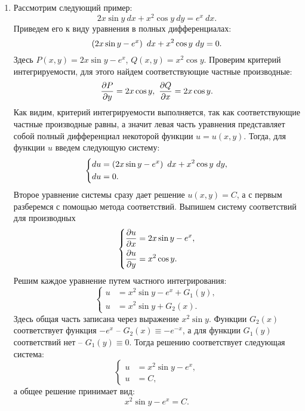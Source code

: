 		\begin{enumerate}

			\item Рассмотрим следующий пример:
				\[ 2x \sin{y} ~ dx + x^2 \cos{y} ~ dy = e^{x} ~ dx. \]
				Приведем его к виду уравнения в полных дифференциалах:
				\[ \left( 2x \sin{y} - e^{x} \right) ~ dx + x^2 \cos{y} ~ dy = 0. \]
				Здесь $P(x, y) = 2x \sin{y} - e^{x}$, $Q(x, y) = x^2 \cos{y}$. Проверим критерий интегрируемости, для этого найдем соответствующие частные производные:
				\[ \dfrac{\partial P}{\partial y} = 2x \cos{y}, ~ \dfrac{\partial Q}{\partial x} = 2x \cos{y}. \]
				Как видим, критерий интегрируемости выполняется, так как соответствующие частные производные равны, а значит левая часть уравнения представляет собой полный дифференциал некоторой функции $u = u(x, y)$. Тогда, для функции $u$ введем следующую систему:
				\[ \left\lbrace \begin{split}
					du &= \left( 2x \sin{y} - e^{x} \right) ~ dx + x^2 \cos{y} ~ dy, \\
					du &= 0.
				\end{split} \right. \]
				Второе уравнение системы сразу дает решение $u(x, y) = C$, а с первым разберемся с помощью метода соответствий. Выпишем систему соответствий для производных
				\[ \left\lbrace \begin{split} 
					\dfrac{\partial u}{\partial x} &= 2x \sin{y} - e^{x}, \\ 
					\dfrac{\partial u}{\partial y} &= x^2 \cos{y}.
				\end{split} \right. \]
				Решим каждое уравнение путем частного интегрирования:
				\[ \left\lbrace \begin{split} 
					u &= x^2 \sin{y} - e^{x} + G_1(y), \\ 
					u &= x^2 \sin{y} + G_2(x).
				\end{split} \right. \]
				Здесь общая часть записана через выражение $x^2 \sin{y}$. Функции $G_2(x)$ соответствует функция $-e^{x}$ -- $G_2(x) \equiv -e^{-x}$, а для функции $G_1(y)$ соответствий нет -- $G_1(y) \equiv 0$. Тогда решению соответствует следующая система:
				\[ \left\lbrace \begin{split} u &= x^2 \sin{y} - e^{x}, \\ u &= C, \end{split} \right. \]
				а общее решение принимает вид:
				\[ x^2 \sin{y} - e^x = C. \]
				

\end{enumerate}
